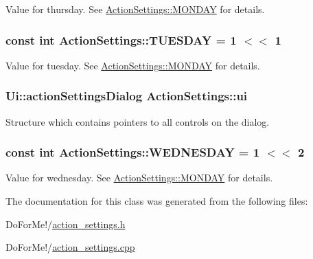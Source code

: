 Value for thursday. See \hyperlink{class_action_settings_a0a99a4562e37a11225063d1a10e0953a}{Action\-Settings\-::\-M\-O\-N\-D\-A\-Y} for details. 

\hypertarget{class_action_settings_a387ace15273bbc582a7debc2fc158693}{
\subsubsection[{T\-U\-E\-S\-D\-A\-Y}]{\setlength{\rightskip}{0pt plus 5cm}const int Action\-Settings\-::\-T\-U\-E\-S\-D\-A\-Y = 1 $<$$<$ 1\hspace{0.3cm}{\ttfamily [static]}}}\label{class_action_settings_a387ace15273bbc582a7debc2fc158693}


Value for tuesday. See \hyperlink{class_action_settings_a0a99a4562e37a11225063d1a10e0953a}{Action\-Settings\-::\-M\-O\-N\-D\-A\-Y} for details. 

\hypertarget{class_action_settings_a426f219e053b2eb7d534fd78cf83d026}{
\subsubsection[{ui}]{\setlength{\rightskip}{0pt plus 5cm}Ui\-::action\-Settings\-Dialog Action\-Settings\-::ui\hspace{0.3cm}{\ttfamily [private]}}}\label{class_action_settings_a426f219e053b2eb7d534fd78cf83d026}


Structure which contains pointers to all controls on the dialog. 

\hypertarget{class_action_settings_a3b16f717b4ce866e31827451147485d2}{
\subsubsection[{W\-E\-D\-N\-E\-S\-D\-A\-Y}]{\setlength{\rightskip}{0pt plus 5cm}const int Action\-Settings\-::\-W\-E\-D\-N\-E\-S\-D\-A\-Y = 1 $<$$<$ 2\hspace{0.3cm}{\ttfamily [static]}}}\label{class_action_settings_a3b16f717b4ce866e31827451147485d2}


Value for wednesday. See \hyperlink{class_action_settings_a0a99a4562e37a11225063d1a10e0953a}{Action\-Settings\-::\-M\-O\-N\-D\-A\-Y} for details. 



The documentation for this class was generated from the following files\-:\begin{DoxyCompactItemize}
\item 
Do\-For\-Me!/\hyperlink{action__settings_8h}{action\-\_\-settings.\-h}\item 
Do\-For\-Me!/\hyperlink{action__settings_8cpp}{action\-\_\-settings.\-cpp}\end{DoxyCompactItemize}
